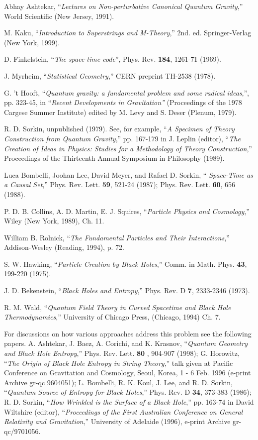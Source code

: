 \begin{references}
  Abhay Ashtekar, ``{\it Lectures on Non-perturbative Canonical
Quantum Gravity},'' World Scientific (New Jersey, 1991).

  M. Kaku, ``{\it Introduction to Superstrings and M-Theory},''
2nd. ed. Springer-Verlag (New York, 1999).

  D. Finkelstein, ``{\it The space-time code}'', Phys. Rev. {\bf %
184}, 1261-71 (1969).

  J. Myrheim, ``{\it Statistical Geometry},'' CERN preprint
TH-2538 (1978).

  G. 't Hooft, ``{\it Quantum gravity: a fundamental problem and
some radical ideas},'', pp. 323-45, in ``{\it Recent Developments in
Gravitation''} (Proceedings of the 1978 Cargese Summer Institute) edited by
M. Levy and S. Deser (Plenum, 1979).

  R. D. Sorkin, unpublished (1979). See, for example, ``{\it A
Specimen of Theory Construction from Quantum Gravity},'' pp. 167-179 in J.
Leplin (editor), ``{\it The Creation of Ideas in Physics: Studies for a
Methodology of Theory Construction},'' Proceedings of the Thirteenth Annual
Symposium in Philosophy (1989).

  Luca Bombelli, Joohan Lee, David Meyer, and Rafael D. Sorkin, ``%
{\it Space-Time as a Causal Set},'' Phys. Rev. Lett. {\bf 59}, 521-24
(1987); Phys. Rev. Lett. {\bf 60}, 656 (1988).

  P. D. B. Collins, A. D. Martin, E. J. Squires, ``{\it Particle
Physics and Cosmology},'' Wiley (New York, 1989), Ch. 11.

  William B. Rolnick, ``{\it The Fundamental Particles and Their
Interactions},'' Addison-Wesley (Reading, 1994), p. 72.

  S. W. Hawking, ``{\it Particle Creation by Black Holes},''
Comm. in Math. Phys. {\bf 43}, 199-220 (1975).

  J. D. Bekenstein, ``{\it Black Holes and Entropy},'' Phys.
Rev. D {\bf 7}, 2333-2346 (1973).

  R. M. Wald, ``{\it Quantum Field Theory in Curved Spacetime
and Black Hole Thermodynamics},'' University of Chicago Press, (Chicago,
1994) Ch. 7.

  For discussions on how various approaches address this problem
see the following papers. A. Ashtekar, J. Baez, A. Corichi, and K. Krasnov,
``{\it Quantum Geometry and Black Hole Entropy},'' Phys. Rev. Lett. {\bf 80}%
, 904-907 (1998); G. Horowitz, ``{\it The Origin of Black Hole Entropy in
String Theory},'' talk given at Pacific Conference on Gravitation and
Cosmology, Seoul, Korea, 1 - 6 Feb. 1996 (e-print Archive gr-qc 9604051); L.
Bombelli, R. K. Koul, J. Lee, and R. D. Sorkin, ``{\it Quantum Source of
Entropy for Black Holes},'' Phys. Rev. D {\bf 34}, 373-383 (1986); R. D.
Sorkin, ``{\it How Wrinkled is the Surface of a Black Hole},'' pp. 163-74 in
David Wiltshire (editor), ``{\it Proceedings of the First Australian
Conference on General Relativity and Gravitation},'' University of Adelaide
(1996), e-print Archive gr-qc/9701056.


\end{references}
